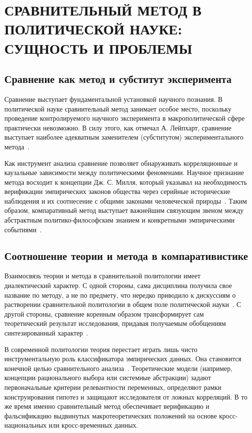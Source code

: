 \section{СРАВНИТЕЛЬНЫЙ МЕТОД В ПОЛИТИЧЕСКОЙ НАУКЕ: СУЩНОСТЬ И ПРОБЛЕМЫ}

\subsection{Сравнение как метод и субститут эксперимента}
Сравнение выступает фундаментальной установкой научного познания. В политической науке сравнительный метод занимает особое место, поскольку проведение контролируемого научного эксперимента в макрополитической сфере практически невозможно. В силу этого, как отмечал А. Лейпхарт, сравнение выступает наиболее адекватным заменителем (субститутом) экспериментального метода~\cite{smorgunov2012}.

Как инструмент анализа сравнение позволяет обнаруживать корреляционные и каузальные зависимости между политическими феноменами. Научное признание метода восходит к концепции Дж. С. Милля, который указывал на необходимость верификации эмпирических законов общества через серийные исторические наблюдения и их соотнесение с общими законами человеческой природы~\cite{smorgunov2012}. Таким образом, компаративный метод выступает важнейшим связующим звеном между абстрактным политико-философским знанием и конкретными эмпирическими событиями~\cite{smorgunov2012}.

\subsection{Соотношение теории и метода в компаративистике}
Взаимосвязь теории и метода в сравнительной политологии имеет диалектический характер. С одной стороны, сама дисциплина получила свое название по методу, а не по предмету, что нередко приводило к дискуссиям о растворении сравнительной политологии в общем поле политической науки~\cite{smorgunov2012}. С другой стороны, сравнение коренным образом трансформирует сам теоретический результат исследования, придавая получаемым обобщениям синтезированный характер~\cite{smorgunov2012}.

В современной политологии теория перестает играть лишь чисто инструментальную роль классификатора эмпирических данных. Она становится конечной целью сравнительного анализа~\cite{smorgunov2012}. Теоретические модели (например, концепции рационального выбора или системные абстракции) задают первоначальные критерии релевантности переменных, определяют рамки конструирования гипотез и защищают исследователя от ложных корреляций. В то же время именно сравнительный метод обеспечивает верификацию и фальсификацию выдвинутых макротеоретических положений на основе кросс-национальных или кросс-временных данных.